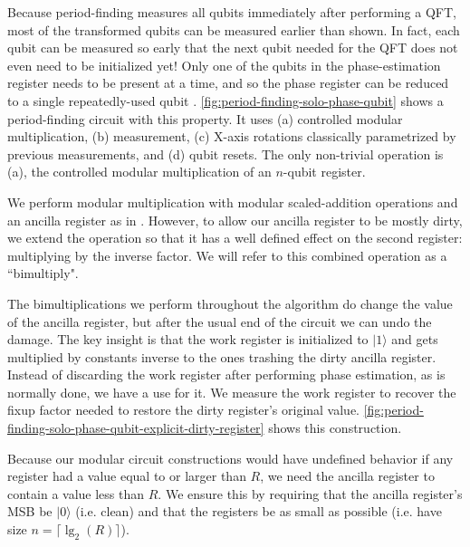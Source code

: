 \documentclass[twocolumn,longbibliography]{quantumarticle}
\begin{document}
Because period-finding measures all qubits immediately after performing a QFT, most of the transformed qubits can be measured earlier than shown.
In fact, each qubit can be measured so early that the next qubit needed for the QFT does not even need to be initialized yet!
Only one of the qubits in the phase-estimation register needs to be present at a time, and so the phase register can be reduced to a single repeatedly-used qubit \cite{zalka1998, mosca1999, parker2000, beauregard2003}.
\autoref{fig:period-finding-solo-phase-qubit} shows a period-finding circuit with this property.
It uses (a) controlled modular multiplication, (b) measurement, (c) X-axis rotations classically parametrized by previous measurements, and (d) qubit resets.
The only non-trivial operation is (a), the controlled modular multiplication of an $n$-qubit register.

We perform modular multiplication with modular scaled-addition operations and an ancilla register as in \cite{beauregard2003}.
However, to allow our ancilla register to be mostly dirty, we extend the operation so that it has a well defined effect on the second register: multiplying by the inverse factor.
We will refer to this combined operation as a ``bimultiply".

The bimultiplications we perform throughout the algorithm do change the value of the ancilla register, but after the usual end of the circuit we can undo the damage.
The key insight is that the work register is initialized to $|1\rangle$ and gets multiplied by constants inverse to the ones trashing the dirty ancilla register.
Instead of discarding the work register after performing phase estimation, as is normally done, we have a use for it.
We measure the work register to recover the fixup factor needed to restore the dirty register's original value.
\autoref{fig:period-finding-solo-phase-qubit-explicit-dirty-register} shows this construction.

Because our modular circuit constructions would have undefined behavior if any register had a value equal to or larger than $R$, we need the ancilla register to contain a value less than $R$.
We ensure this by requiring that the ancilla register's MSB be $|0\rangle$ (i.e. clean) and that the registers be as small as possible (i.e. have size $n = \lceil \lg_2(R) \rceil$).
\end{document}
